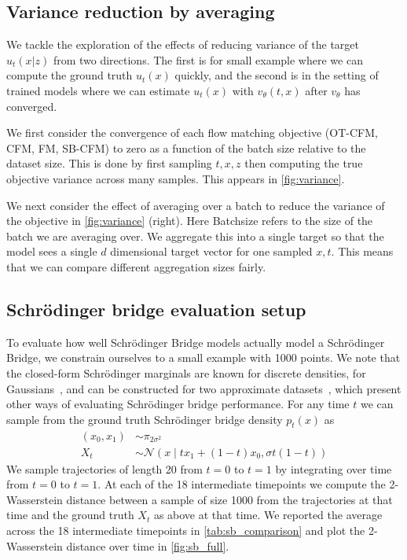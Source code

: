\documentclass[10pt]{article}
\theoremstyle{plain}
\theoremstyle{definition}
\theoremstyle{remark}
\begin{document}
\subsection{Variance reduction by averaging}

We tackle the exploration of the effects of reducing variance of the target $u_t(x|z)$ from two directions. The first is for small example where we can compute the ground truth $u_t(x)$ quickly, and the second is in the setting of trained models where we can estimate $u_t(x)$ with $v_\theta(t,x)$ after $v_\theta$ has converged.

We first consider the convergence of each flow matching objective (OT-CFM, CFM, FM, SB-CFM) to zero as a function of the batch size relative to the dataset size. This is done by first sampling $t,x,z$ then computing the true objective variance across many samples. This appears in \autoref{fig:variance}.

We next consider the effect of averaging over a batch to reduce the variance of the objective in \autoref{fig:variance} (right). Here Batchsize refers to the size of the batch we are averaging over. We aggregate this into a single target so that the model sees a single $d$ dimensional target vector for one sampled $x,t$. This means that we can compare different aggregation sizes fairly. 

 

\subsection{Schr\"odinger bridge evaluation setup}

To evaluate how well Schr\"odinger Bridge models actually model a Schr\"odinger Bridge, we constrain ourselves to a small example with 1000 points. We note that the closed-form Schr\"odinger marginals are known for discrete densities, for Gaussians~\citep{mallasto_entropy_2021}, and can be constructed for two approximate datasets~\citep{korotin_do_2021}, which present other ways of evaluating Schr\"odinger bridge performance. For any time $t$ we can sample from the ground truth Schr\"odinger bridge density $p_t(x)$ as
\begin{align*}
(x_0, x_1) &\sim \pi_{2 \sigma^2}\\
X_t &\sim \mathcal{N}(x \mid t x_1 + (1-t) x_0, \sigma t (1-t))
\end{align*}
We sample trajectories of length 20 from $t=0$ to $t=1$ by integrating over time from $t=0$ to $t=1$. At each of the 18 intermediate timepoints we compute the 2-Wasserstein distance between a sample of size 1000 from the trajectories at that time and the ground truth $X_t$ as above at that time. We reported the average across the 18 intermediate timepoints in \autoref{tab:sb_comparison} and plot the 2-Wasserstein distance over time in \autoref{fig:sb_full}. 
\end{document}
